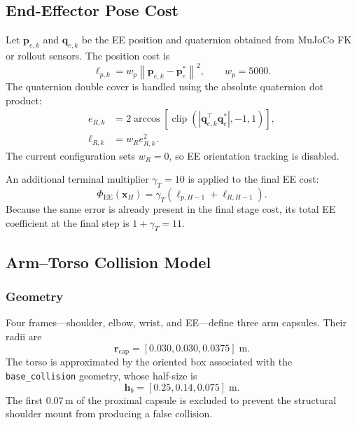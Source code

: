 \documentclass[11pt,a4paper]{article}
\newcommand{\sqnorm}[1]{\left\lVert #1 \right\rVert^2}
\newcommand{\clip}{\operatorname{clip}}
\newcommand{\code}[1]{\texttt{#1}}
\begin{document}
\subsection{End-Effector Pose Cost}

Let $\bm{p}_{e,k}$ and $\bm{q}_{e,k}$ be the EE position and quaternion
obtained from MuJoCo FK or rollout sensors. The position cost is
\begin{equation}
  \ell_{p,k}=
  w_p\sqnorm{\bm{p}_{e,k}-\bm{p}_e^*},
  \qquad w_p=5000.
\end{equation}
The quaternion double cover is handled using the absolute quaternion dot
product:
\begin{align}
  e_{R,k}
  &=2\arccos\left[
    \clip\left(
      \left|\bm{q}_{e,k}^\top\bm{q}_e^*\right|,-1,1
    \right)
  \right],\\
  \ell_{R,k}
  &=w_R e_{R,k}^2.
\end{align}
The current configuration sets $w_R=0$, so EE orientation tracking is
disabled.

An additional terminal multiplier $\gamma_T=10$ is applied to the final EE
cost:
\begin{equation}
  \Phi_{\mathrm{EE}}(\bm{x}_H)
  =\gamma_T(\ell_{p,H-1}+\ell_{R,H-1}).
\end{equation}
Because the same error is already present in the final stage cost, its total
EE coefficient at the final step is $1+\gamma_T=11$.

\subsection{Arm--Torso Collision Model}

\subsubsection{Geometry}

Four frames---shoulder, elbow, wrist, and EE---define three arm capsules. Their
radii are
\begin{equation}
  \bm{r}_{\mathrm{cap}}=
  [0.030,0.030,0.0375]\;\mathrm{m}.
\end{equation}
The torso is approximated by the oriented box associated with the
\code{base\_collision} geometry, whose half-size is
\begin{equation}
  \bm{h}_b=[0.25,0.14,0.075]\;\mathrm{m}.
\end{equation}
The first $0.07\,\mathrm{m}$ of the proximal capsule is excluded to prevent
the structural shoulder mount from producing a false collision.
\end{document}
